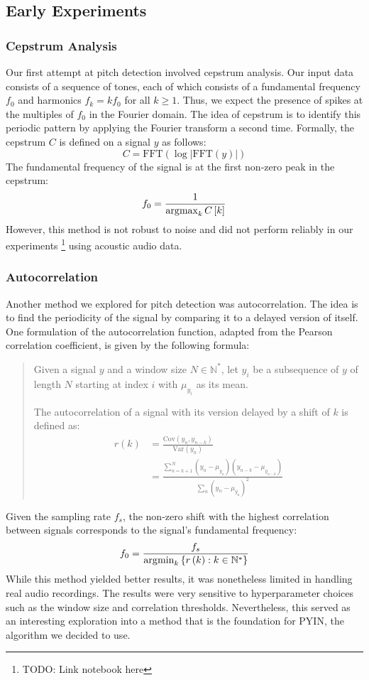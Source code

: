 \subsection{Early Experiments}
\label{sec:experiments}

\subsubsection{Cepstrum Analysis}

Our first attempt at pitch detection involved cepstrum analysis. Our input data consists of a sequence of tones, each of which consists of a fundamental frequency $f_0$ and harmonics $f_k = k f_0$ for all $k \geq 1$. Thus, we expect the presence of spikes at the multiples of $f_0$ in the Fourier domain. The idea of cepstrum is to identify this periodic pattern by applying the Fourier transform a second time. Formally, the cepstrum $C$ is defined on a signal $y$ as follows:
$$C = \text{FFT}\left(\log\left|\text{FFT}\left(y\right)\right|\right)$$
The fundamental frequency of the signal is at the first non-zero peak in the cepstrum:
$$f_0 = \frac{1}{\operatorname*{\arg\!\max}_{k} C\left[k\right]}$$
However, this method is not robust to noise and did not perform reliably in our experiments \footnote{TODO: Link notebook here} using acoustic audio data.

\subsubsection{Autocorrelation}

Another method we explored for pitch detection was autocorrelation. The idea is to find the periodicity of the signal by comparing it to a delayed version of itself. One formulation of the autocorrelation function, adapted from the Pearson correlation coefficient, is given by the following formula:
\begin{quote}
    Given a signal $y$ and a window size $N \in \mathbb N^\ast$, let $y_i$ be a subsequence of $y$ of length $N$ starting at index $i$ with $\mu_{y_i}$ as its mean.

    The autocorrelation of a signal with its version delayed by a shift of $k$ is defined as:
    \begin{align*}
        r\left(k\right)
        &= \frac{\text{Cov}\left(y_n, y_{n-k}\right)}{\text{Var}\left(y_n\right)} \\
        &= \frac{\sum_{n=k+1}^N \left(y_n - \mu_{y_n}\right) \left(y_{n-k} - \mu_{y_{n-k}}\right)}{\sum_n \left(y_n - \mu_{y_n}\right)^2}
    \end{align*}
\end{quote}
Given the sampling rate $f_s$, the non-zero shift with the highest correlation between signals corresponds to the signal's fundamental frequency:
$$f_0 = \frac{f_s}{\operatorname*{\arg\!\min}_{k}\left\{ r\left(k\right) : k \in \mathbb N^\ast \right\}}$$
While this method yielded better results, it was nonetheless limited in handling real audio recordings. The results were very sensitive to hyperparameter choices such as the window size and correlation thresholds. Nevertheless, this served as an interesting exploration into a method that is the foundation for PYIN, the algorithm we decided to use.

